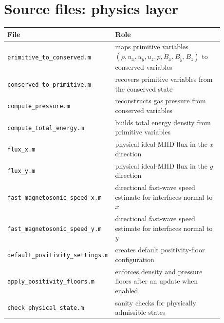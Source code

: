 \documentclass[11pt]{article}
\begin{document}
\section{Source files: physics layer}
\begin{center}
\begin{tabular}{p{0.33\linewidth} p{0.55\linewidth}}
\toprule
\textbf{File} & \textbf{Role} \\
\midrule
\texttt{primitive\_to\_conserved.m} & maps primitive variables $(\rho,u_x,u_y,u_z,p,B_x,B_y,B_z)$ to conserved variables \\
\texttt{conserved\_to\_primitive.m} & recovers primitive variables from the conserved state \\
\texttt{compute\_pressure.m} & reconstructs gas pressure from conserved variables \\
\texttt{compute\_total\_energy.m} & builds total energy density from primitive variables \\
\texttt{flux\_x.m} & physical ideal-MHD flux in the $x$ direction \\
\texttt{flux\_y.m} & physical ideal-MHD flux in the $y$ direction \\
\texttt{fast\_magnetosonic\_speed\_x.m} & directional fast-wave speed estimate for interfaces normal to $x$ \\
\texttt{fast\_magnetosonic\_speed\_y.m} & directional fast-wave speed estimate for interfaces normal to $y$ \\
\texttt{default\_positivity\_settings.m} & creates default positivity-floor configuration \\
\texttt{apply\_positivity\_floors.m} & enforces density and pressure floors after an update when enabled \\
\texttt{check\_physical\_state.m} & sanity checks for physically admissible states \\
\bottomrule
\end{tabular}
\end{center}
\end{document}
